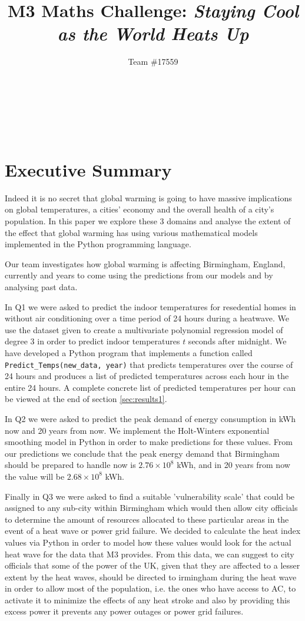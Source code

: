 \documentclass[11pt]{article}
\title{M3 Maths Challenge: \textit{Staying Cool as the World Heats Up}}
\author{Team \#17559}
\makeatletter
\renewcommand{\maketitle}{
    \begin{center}
        {\sffamily\bfseries\LARGE \@title} \\[1em]
        {\sffamily\large \@author} \\[1em]
        {\sffamily\large \thedate} \\[1em]
    \end{center}
    \vspace{1em}
}
\makeatother
\begin{document}
\maketitle

\section{Executive Summary}

Indeed it is no secret that global warming is going to have massive implications on global temperatures, a cities' economy and
the overall health of a city's population. In this paper we explore these 3 domains and analyse the extent of the effect that
global warming has using various mathematical models implemented in the Python programming language.

Our team investigates how global warming is affecting Birmingham, England, currently and years to come using the predictions
from our models and by analysing past data.
\vspace{0.3cm}

In Q1 we were asked to predict the indoor temperatures for resedential homes in without air conditioning over a time period of
24 hours during a heatwave. We use the dataset given \cite{m3} to create a multivariate polynomial regression model of degree
3 in order to predict indoor temperatures $t$ seconds after midnight. We have developed a Python program that implements a
function called \texttt{Predict\_Temps(new\_data, year)} that predicts temperatures over the course of 24 hours and produces a
list of predicted temperatures across each hour in the entire 24 hours. A complete concrete list of predicted temperatures
per hour can be viewed at the end of section \ref{sec:results1}.

In Q2 we were asked to predict the peak demand of energy consumption in kWh now and 20 years from now. We implement the
Holt-Winters exponential smoothing model in Python in order to make predictions for these values. From our predictions we
conclude that the peak energy demand that Birmingham should be prepared to handle now is $2.76 \times 10^8$ kWh, and in 20
years from now the value will be $2.68 \times 10^8$ kWh.

Finally in Q3 we were asked to find a suitable 'vulnerability scale' that could be assigned to any sub-city within Birmingham which would then allow city officials to determine the amount of resources allocated to these particular areas in the event of a heat wave or power grid failure. We decided to calculate the heat index values via Python in order to model how these values would look for the actual heat wave for the data that M3 provides. From this data, we can suggest to city officials that some of the power of the UK, given that they are affected to a lesser extent by the heat waves, should be directed to irmingham during the heat wave in order to allow most of the population, i.e. the ones who have access to AC, to activate it to minimize the effects of any heat stroke and also by providing this excess power it prevents any power outages or power grid failures.
\end{document}
